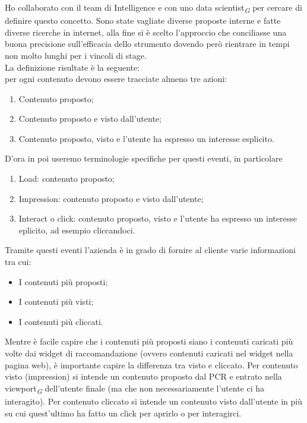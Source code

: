 \documentclass[a4paper, 12pt, twoside, openright]{book}
\newcommand{\gloss}[1]{#1\textsubscript{\textit{\tiny{G}}}}
\begin{document}
Ho collaborato con il team di Intelligence e con uno \gloss{data scientist} per cercare di definire questo concetto. Sono state vagliate diverse proposte interne e fatte diverse ricerche in internet, alla fine si è scelto l'approccio che conciliasse una buona precisione sull'efficacia dello strumento dovendo però rientrare in tempi non molto lunghi per i vincoli di stage.\\
La definizione risultate è la seguente:\\
per ogni contenuto devono essere tracciate almeno tre azioni:
\begin{enumerate}
\item Contenuto proposto;
\item Contenuto proposto e visto dall'utente;
\item Contenuto proposto, visto e l'utente ha espresso un interesse esplicito.
\end{enumerate}
D'ora in poi useremo terminologie specifiche per questi eventi, in particolare
\begin{enumerate}
\item Load: contenuto proposto;
\item Impression: contenuto proposto e visto dall'utente;
\item Interact o click: contenuto proposto, visto e l'utente ha espresso un interesse eplicito, ad esempio cliccandoci.
\end{enumerate}
Tramite questi eventi l'azienda è in grado di fornire al cliente varie informazioni tra cui:
\begin{itemize}
\item I contenuti più proposti;
\item I contenuti più visti;
\item I contenuti più cliccati.
\end{itemize}

Mentre è facile capire che i contenuti più proposti siano i contenuti caricati più volte dai widget di raccomandazione (ovvero contenuti caricati nel widget nella pagina web), è importante capire la differenza tra visto e cliccato. Per contenuto visto (impression) si intende un contenuto proposto dal PCR e entrato nella \gloss{viewport} dell'utente finale (ma che non necessariamente l'utente ci ha interagito). Per contenuto cliccato si intende un contenuto visto dall'utente in più su cui quest'ultimo ha fatto un click per 
aprirlo o per interagirci.\\
\end{document}
